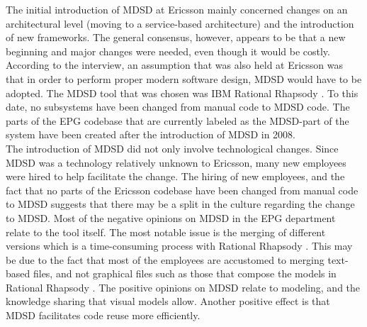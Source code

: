 \documentclass[final_report_innit.tex]{subfiles}
\begin{document}
The initial introduction of MDSD at Ericsson mainly concerned changes on an architectural level (moving to a service-based architecture) and the introduction of new frameworks. The general consensus, however, appears to be that a new beginning and major changes were needed, even though it would be costly. According to the interview, an assumption that was also held at Ericsson was that in order to perform proper modern software design, MDSD would have to be adopted. The MDSD tool that was chosen was IBM Rational Rhapsody \cite{rrf}. To this date, no subsystems have been changed from manual code to MDSD code. The parts of the EPG codebase that are currently labeled as the MDSD-part of the system have been created after the introduction of MDSD in 2008. 
\\

The introduction of MDSD did not only involve technological changes. Since MDSD was a technology relatively unknown to Ericsson, many new employees were hired to help facilitate the change. The hiring of new employees, and the fact that no parts of the Ericsson codebase have been changed from manual code to MDSD suggests that there may be a split in the culture regarding the change to MDSD. Most of the negative opinions on MDSD in the EPG department relate to the tool \cite{rrf} itself. The most notable issue is the merging of different versions which is a time-consuming process with Rational Rhapsody \cite{rrf}. This may be due to the fact that most of the employees are accustomed to merging text-based files, and not graphical files such as those that compose the models in Rational Rhapsody \cite{rrf}. The positive opinions on MDSD relate to modeling, and the knowledge sharing that visual models allow. Another positive effect is that MDSD facilitates code reuse more efficiently. 
\end{document}
